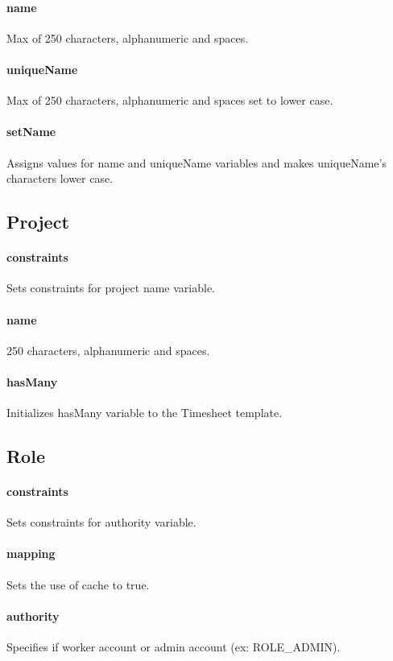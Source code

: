 \documentclass[12pt]{article}
\begin{document}
\paragraph{name} Max of 250 characters, alphanumeric and spaces.
\paragraph{uniqueName} Max of 250 characters, alphanumeric and spaces  set to lower case.
\paragraph{setName} Assigns values for name and uniqueName variables and makes uniqueName's characters lower case.

\setcounter{paragraph}{0}
\subsection{Project}\label{sec:DProject}
\paragraph{constraints} Sets constraints for project name variable.
\paragraph{name} 250 characters, alphanumeric and spaces.
\paragraph{hasMany} Initializes hasMany variable to the Timesheet template.

\setcounter{paragraph}{0}
\subsection{Role}\label{sec:DRole}
\paragraph{constraints} Sets constraints for authority variable.
\paragraph{mapping} Sets the use of cache to true.
\paragraph{authority} Specifies if worker account or admin account (ex: ROLE_ADMIN).
\end{document}
